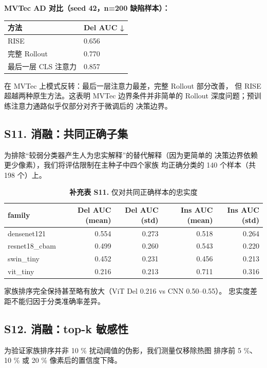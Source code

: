 \documentclass[11pt,a4paper]{article}
\begin{document}
\textbf{MVTec AD 对比（seed 42，n=200 缺陷样本）：}

\begin{tabular}{ll}
\toprule
方法 & Del AUC ↓ \\
\midrule
RISE & 0.656 \\
完整 Rollout & 0.770 \\
最后一层 CLS 注意力 & 0.857 \\
\bottomrule
\end{tabular}


在 MVTec 上模式反转：最后一层注意力最差，完整 Rollout 部分改善， 但 RISE 超越两种原生方法。这表明 MVTec 边界条件并非简单的 Rollout 深度问题；预训练注意力通路似乎仅部分对齐于微调后的 决策边界。

\subsection*{S11. 消融：共同正确子集}

为排除“较弱分类器产生人为忠实解释”的替代解释（因为更简单的 决策边界依赖更少像素），我们将评估限制在主种子中四个家族 均正确分类的 140 个样本（共 198 个）上。

\begin{table}[htbp]
\centering
\small
\caption{\textbf{补充表 S11.} 仅对共同正确样本的忠实度}
\begin{tabular}{lrrrr}
\toprule
family & Del AUC (mean) & Del AUC (std) & Ins AUC (mean) & Ins AUC (std) \\
\midrule
densenet121 & 0.554 & 0.273 & 0.518 & 0.264 \\
resnet18\_cbam & 0.499 & 0.260 & 0.543 & 0.220 \\
swin\_tiny & 0.452 & 0.231 & 0.456 & 0.213 \\
vit\_tiny & 0.216 & 0.213 & 0.711 & 0.316 \\
\bottomrule
\end{tabular}
\end{table}

家族排序完全保持甚至略有放大（ViT Del 0.216 vs CNN 0.50–0.55）。 忠实度差距不能归因于分类准确率差异。

\subsection*{S12. 消融：top-k 敏感性}

为验证家族排序并非 10 \% 扰动阈值的伪影，我们测量仅移除热图 排序前 5 \%、10 \% 或 20 \% 像素后的置信度下降。
\end{document}
